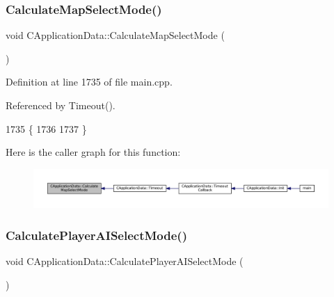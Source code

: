 \subsubsection{\texorpdfstring{Calculate\+Map\+Select\+Mode()}{CalculateMapSelectMode()}}
{\footnotesize\ttfamily void C\+Application\+Data\+::\+Calculate\+Map\+Select\+Mode (\begin{DoxyParamCaption}{ }\end{DoxyParamCaption})\hspace{0.3cm}{\ttfamily [protected]}}



Definition at line 1735 of file main.\+cpp.



Referenced by Timeout().


\begin{DoxyCode}
1735                                              \{
1736 
1737 \}
\end{DoxyCode}
Here is the caller graph for this function\+:\nopagebreak
\begin{figure}[H]
\begin{center}
\leavevmode
\includegraphics[width=350pt]{classCApplicationData_a3c481d6483d165488596144a4bcf95cf_icgraph}
\end{center}
\end{figure}
\hypertarget{classCApplicationData_afbd3d397ba6bb36452458cf8f62ef9dc}{}\label{classCApplicationData_afbd3d397ba6bb36452458cf8f62ef9dc} 
\subsubsection{\texorpdfstring{Calculate\+Player\+A\+I\+Select\+Mode()}{CalculatePlayerAISelectMode()}}
{\footnotesize\ttfamily void C\+Application\+Data\+::\+Calculate\+Player\+A\+I\+Select\+Mode (\begin{DoxyParamCaption}{ }\end{DoxyParamCaption})\hspace{0.3cm}{\ttfamily [protected]}}



